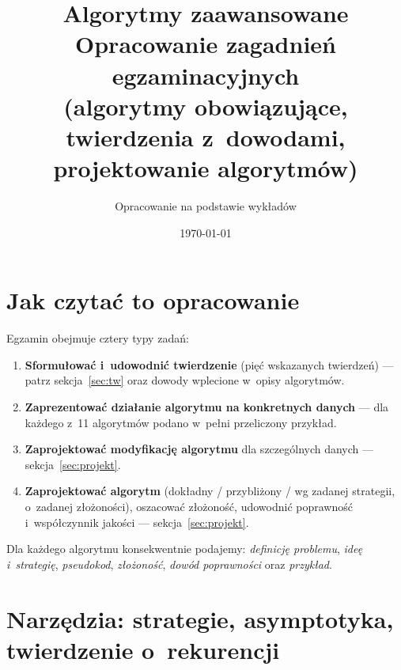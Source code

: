\documentclass[11pt,a4paper]{article}
\title{\textbf{Algorytmy zaawansowane}\\[2mm]
\large Opracowanie zagadnień egzaminacyjnych\\
\normalsize (algorytmy obowiązujące, twierdzenia z~dowodami, projektowanie algorytmów)}
\author{Opracowanie na podstawie wykładów}
\date{\today}
\theoremstyle{plain}
\theoremstyle{definition}
\begin{document}
\maketitle
\tableofcontents
\bigskip

\section*{Jak czytać to opracowanie}
Egzamin obejmuje cztery typy zadań:
\begin{enumerate}[label=\textbf{\arabic*.}]
\item \textbf{Sformułować i~udowodnić twierdzenie} (pięć wskazanych twierdzeń) --- patrz
sekcja~\ref{sec:tw} oraz dowody wplecione w~opisy algorytmów.
\item \textbf{Zaprezentować działanie algorytmu na konkretnych danych} --- dla każdego z~11
algorytmów podano w~pełni przeliczony przykład.
\item \textbf{Zaprojektować modyfikację algorytmu} dla szczególnych danych --- sekcja~\ref{sec:projekt}.
\item \textbf{Zaprojektować algorytm} (dokładny / przybliżony / wg zadanej strategii, o~zadanej
złożoności), oszacować złożoność, udowodnić poprawność i~współczynnik jakości --- sekcja~\ref{sec:projekt}.
\end{enumerate}
Dla każdego algorytmu konsekwentnie podajemy: \emph{definicję problemu}, \emph{ideę i~strategię},
\emph{pseudokod}, \emph{złożoność}, \emph{dowód poprawności} oraz \emph{przykład}.

\section{Narzędzia: strategie, asymptotyka, twierdzenie o~rekurencji}\label{sec:tools}
\end{document}
